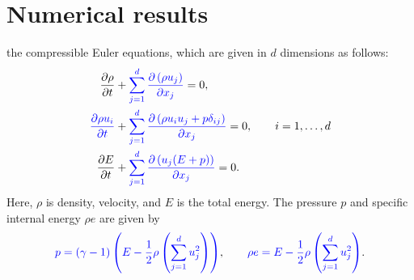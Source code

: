 \documentclass[review,onefignum,onetabnum,final]{siamart171218}
\newcommand{\pd}[2]{\frac{\partial#1}{\partial#2}}
\newcommand{\LRp}[1]{\left( #1 \right)}
\newcommand{\LRb}[1]{\left| #1 \right|}
\newcommand{\note}[1]{{\color{blue}{#1}}}
\begin{document}
\section{Numerical results}
\label{sec:3}

\note{In this section, we present numerical examples for} the compressible Euler equations, which are given in $d$ dimensions as follows:
\begin{align*}
\pd{\rho}{t} &+ \note{\sum_{j=1}^d \pd{\LRp{\rho {u}_j}}{x_j}} = 0,\\
\note{\pd{\rho {u}_i}{t}} &+ \note{\sum_{j=1}^d \pd{\LRp{\rho u_iu_j + p\delta_{ij} }}{x_j}} = 0, \qquad i = 1,\ldots,d\\
\pd{E}{t} &+ \note{\sum_{j=1}^d \pd{\LRp{{u}_j(E+p)}}{x_j}} = 0.\nonumber
\end{align*}
Here, $\rho$ is density, \note{$u_i$ denotes the $i$th component of} velocity, and $E$ is the total energy.  The pressure $p$ and specific internal energy $\rho e$ are given by 
\[
\note{p = (\gamma-1)\LRp{E - \frac{1}{2}\rho \LRp{\sum_{j=1}^d u_j^2}}}, \qquad \note{\rho e = E - \frac{1}{2}\rho \LRp{\sum_{j=1}^d u_j^2}}. %
\]
\end{document}
